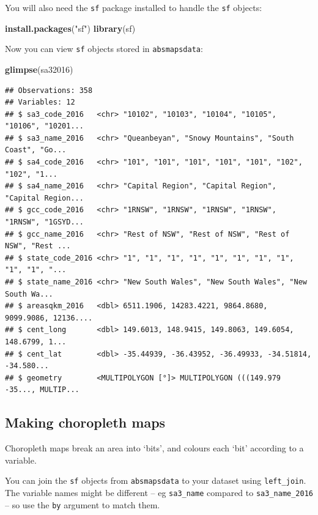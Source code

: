 \documentclass[]{book}
\newenvironment{Shaded}{\begin{snugshade}}{\end{snugshade}}
\newcommand{\KeywordTok}[1]{\textcolor[rgb]{0.13,0.29,0.53}{\textbf{#1}}}
\newcommand{\NormalTok}[1]{#1}
\newcommand{\StringTok}[1]{\textcolor[rgb]{0.31,0.60,0.02}{#1}}
\begin{document}
You will also need the \texttt{sf} package installed to handle the \texttt{sf} objects:

\begin{Shaded}
\begin{Highlighting}[]
\KeywordTok{install.packages}\NormalTok{(}\StringTok{"sf"}\NormalTok{)}
\KeywordTok{library}\NormalTok{(sf)}
\end{Highlighting}
\end{Shaded}

Now you can view \texttt{sf} objects stored in \texttt{absmapsdata}:

\begin{Shaded}
\begin{Highlighting}[]
\KeywordTok{glimpse}\NormalTok{(sa32016)}
\end{Highlighting}
\end{Shaded}

\begin{verbatim}
## Observations: 358
## Variables: 12
## $ sa3_code_2016   <chr> "10102", "10103", "10104", "10105", "10106", "10201...
## $ sa3_name_2016   <chr> "Queanbeyan", "Snowy Mountains", "South Coast", "Go...
## $ sa4_code_2016   <chr> "101", "101", "101", "101", "101", "102", "102", "1...
## $ sa4_name_2016   <chr> "Capital Region", "Capital Region", "Capital Region...
## $ gcc_code_2016   <chr> "1RNSW", "1RNSW", "1RNSW", "1RNSW", "1RNSW", "1GSYD...
## $ gcc_name_2016   <chr> "Rest of NSW", "Rest of NSW", "Rest of NSW", "Rest ...
## $ state_code_2016 <chr> "1", "1", "1", "1", "1", "1", "1", "1", "1", "1", "...
## $ state_name_2016 <chr> "New South Wales", "New South Wales", "New South Wa...
## $ areasqkm_2016   <dbl> 6511.1906, 14283.4221, 9864.8680, 9099.9086, 12136....
## $ cent_long       <dbl> 149.6013, 148.9415, 149.8063, 149.6054, 148.6799, 1...
## $ cent_lat        <dbl> -35.44939, -36.43952, -36.49933, -34.51814, -34.580...
## $ geometry        <MULTIPOLYGON [°]> MULTIPOLYGON (((149.979 -35..., MULTIP...
\end{verbatim}

\hypertarget{making-choropleth-maps}{%
\subsection{Making choropleth maps}\label{making-choropleth-maps}}

Choropleth maps break an area into `bits', and colours each `bit' according to a variable.

You can join the \texttt{sf} objects from \texttt{absmapsdata} to your dataset using \texttt{left\_join}. The variable names might be different -- eg \texttt{sa3\_name} compared to \texttt{sa3\_name\_2016} -- so use the \texttt{by} argument to match them.
\end{document}
